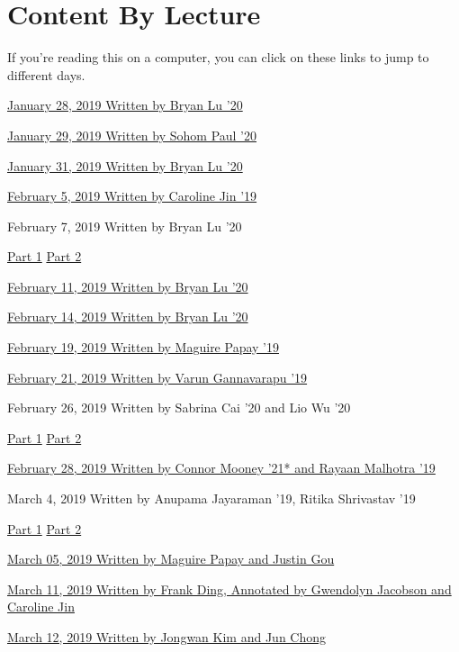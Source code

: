 \section*{Content By Lecture}
If you're reading this on a computer, you can click on these links to 
jump to different days. 

\hyperref[01-0128]{January 28, 2019 \dotfill Written by Bryan Lu '20}

\hyperref[02-0129]{January 29, 2019 \dotfill Written by Sohom Paul '20} 

\hyperref[03-0131]{January 31, 2019 \dotfill Written by Bryan Lu '20} 

\hyperref[04-0205]{February 5, 2019 \dotfill Written by Caroline Jin '19} 

February 7, 2019 \dotfill Written by Bryan Lu '20

\hyperref[05-0207-1]{Part 1} \qquad 
\hyperref[05-0207-2]{Part 2}

\hyperref[06-0211]{February 11, 2019 \dotfill Written by Bryan Lu '20}

\hyperref[07-0214]{February 14, 2019 \dotfill Written by Bryan Lu '20}

\hyperref[08-0219]{February 19, 2019 \dotfill Written by Maguire Papay '19}

\hyperref[09-0221]{February 21, 2019 \dotfill Written by Varun Gannavarapu '19}

February 26, 2019 \dotfill Written by Sabrina Cai '20 and Lio Wu '20

\hyperref[11-0226-1]{Part 1} \qquad 
\hyperref[11-0226-2]{Part 2}

\hyperref[12-0228]{February 28, 2019 \dotfill Written by Connor Mooney '21* and Rayaan Malhotra '19}

March 4, 2019 \dotfill Written by Anupama Jayaraman '19, Ritika Shrivastav '19

\hyperref[13-0304-1]{Part 1} \qquad 
\hyperref[13-0304-2]{Part 2} 

\hyperref[14-0305]{March 05, 2019 \dotfill Written by Maguire Papay and Justin Gou}

\hyperref[16-0311]{March 11, 2019 \dotfill Written by Frank Ding, Annotated by Gwendolyn Jacobson and Caroline Jin}

\hyperref[17-0312]{March 12, 2019 \dotfill Written by Jongwan Kim and Jun Chong}
